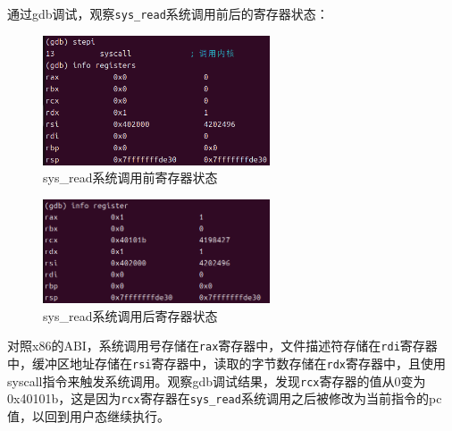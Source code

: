\documentclass[UTF8]{report}
\begin{document}
通过gdb调试，观察\texttt{sys_read}系统调用前后的寄存器状态：

\begin{figure}[H]
  \centering
  \includegraphics[width=0.6\textwidth]{beforesysread_reg.png}
  \caption{sys\_read系统调用前寄存器状态}
\end{figure}

\begin{figure}[H]
  \centering
  \includegraphics[width=0.6\textwidth]{aftersysread_reg.png}
  \caption{sys\_read系统调用后寄存器状态}
\end{figure}

对照x86的ABI，系统调用号存储在\texttt{rax}寄存器中，文件描述符存储在\texttt{rdi}寄存器中，缓冲区地址存储在\texttt{rsi}寄存器中，读取的字节数存储在\texttt{rdx}寄存器中，且使用syscall指令来触发系统调用。观察gdb调试结果，发现\texttt{rcx}寄存器的值从0变为0x40101b，这是因为\texttt{rcx}寄存器在\texttt{sys_read}系统调用之后被修改为当前指令的pc值，以回到用户态继续执行。
\end{document}
